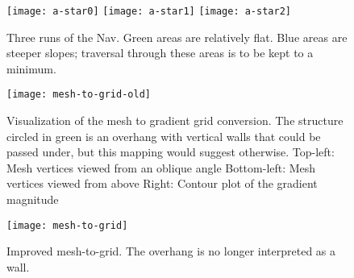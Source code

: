 \begin{figure}[htbp]
    \centering
    \texttt{[image: a-star0]}
    \texttt{[image: a-star1]}
    \texttt{[image: a-star2]}
    \caption{
        Three runs of the Nav. Green areas are relatively flat. Blue areas are steeper slopes; traversal through these
        areas is to be kept to a minimum.
    }\label{fig:nav-tests}
\end{figure}

\begin{figure}[htbp]
    \centering
    \texttt{[image: mesh-to-grid-old]}
    \caption{
        Visualization of the mesh to gradient grid conversion. The structure circled in green is an overhang with vertical walls that could be passed under, but this mapping would suggest otherwise.\linebreak
        Top-left: Mesh vertices viewed from an oblique angle\linebreak
        Bottom-left: Mesh vertices viewed from above\linebreak
        Right: Contour plot of the gradient magnitude
    }
\end{figure}

\begin{figure}[htbp]
    \centering
    \texttt{[image: mesh-to-grid]}
    \caption{Improved mesh-to-grid. The overhang is no longer interpreted as a wall.}
\end{figure}
